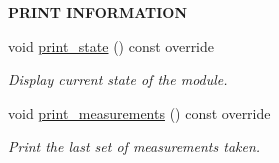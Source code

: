 \begin{Indent}{\bf P\+R\+I\+NT I\+N\+F\+O\+R\+M\+A\+T\+I\+ON}\par
\begin{DoxyCompactItemize}
\item 
void \hyperlink{class_loom___m_p_u6050_a34dce6c99de2f323287598400499a4c4}{print\+\_\+state} () const override
\begin{DoxyCompactList}\small\item\em Display current state of the module. \end{DoxyCompactList}\item 
void \hyperlink{class_loom___m_p_u6050_a9b6f6fbf9359caf4b4860c4d26fefde1}{print\+\_\+measurements} () const override
\begin{DoxyCompactList}\small\item\em Print the last set of measurements taken. \end{DoxyCompactList}\end{DoxyCompactItemize}
\end{Indent}
